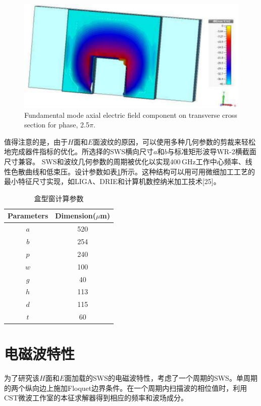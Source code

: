 \documentclass[10pt,a4paper,UTF8]{ctexart}
\begin{document}
\begin{figure}[phtb]
	\centering
	\includegraphics[width=0.95\linewidth]{figure/fig2}
	\caption{Fundamental mode axial electric field component on transverse cross section for phase, 2.5$ \pi $.}
	\label{fig2}
\end{figure}

值得注意的是，由于$H$面和$E$面波纹的原因，可以使用多种几何参数的剪裁来轻松地完成器件指标的优化。所选择的SWS横向尺寸$ a $和$ b $与标准矩形波导WR-2横截面尺寸兼容。 SWS和波纹几何参数的周期被优化以实现400\,GHz工作中心频率、线性色散曲线和低束压。设计参数如表\ref{tab:1}所示。这种结构可以用可用微细加工工艺的最小特征尺寸实现，如LIGA、DRIE和计算机数控纳米加工技术[25]。
\begin{table}[htbp]
	\caption{盒型窗计算参数}
	\centering
	\begin{tabular}{cc}
		\toprule
		Parameters & Dimension($ \mu $m) \\ \midrule
		$ a $    &         520         \\
		$ b $    &         254         \\
		$ p $    &         240         \\
		$ w $    &         100         \\
		$ g $    &         40          \\
		$ h $    &         113         \\
		$ d $    &         115         \\
		$ t $    &         60          \\ \bottomrule
	\end{tabular}
	\label{tab:1}
\end{table}
\section{电磁波特性} \label{sec:3}
为了研究该$H$面和$E$面加载的SWS的电磁波特性，考虑了一个周期的SWS。单周期的两个纵向边上施加Floquet边界条件。在一个周期内扫描波的相位值时，利用CST微波工作室的本征求解器得到相应的频率和波场成分。
\end{document}
